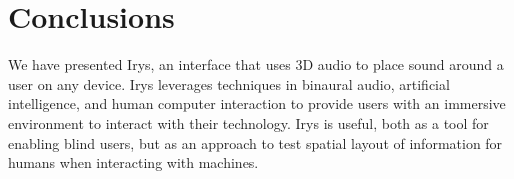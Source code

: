\newpage                                                  \chapter{Conclusions}

We have presented Irys, an interface that uses 3D audio to place sound around a
user on any device. Irys leverages techniques in binaural audio, artificial
intelligence, and human computer interaction to provide users with an immersive
environment to interact with their technology. Irys is useful, both as a tool
for enabling blind users, but as an approach to test spatial layout of
information for humans when interacting with machines.


\newpage                                                  {}

